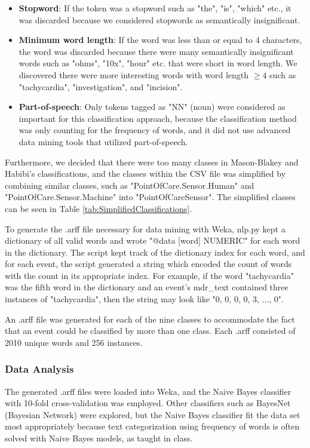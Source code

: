 \documentclass[11pt, notitlepage,abstracton,oneside]{article}   	%
\begin{document}
\begin{itemize}
	\item \textbf{Stopword}: If the token was a stopword such as "the", "is", "which" etc., it was discarded because we considered stopwords as semantically insignificant.
	\item \textbf{Minimum word length}: If the word was less than or equal to 4 characters, the word was discarded because there were many semantically insignificant words such as "ohms", "10x", "hour" etc. that were short in word length. We discovered there were more interesting words with word length $\geq 4$ such as "tachycardia", "investigation", and "incision".
	\item \textbf{Part-of-speech}: Only tokens tagged as "NN" (noun) were considered as important for this classification approach, because the classification method was only counting for the frequency of words, and it did not use advanced data mining tools that utilized part-of-speech.
\end{itemize}

Furthermore, we decided that there were too many classes in Mason-Blakey and Habibi's classifications, and the classes within the CSV file was simplified by combining similar classes, such as "PointOfCare.Sensor.Human" and "PointOfCare.Sensor.Machine" into "PointOfCareSensor". The simplified classes can be seen in Table \ref{tab:SimplifiedClassifications}.

To generate the .arff file necessary for data mining with Weka, nlp.py kept a dictionary of all valid words and wrote "@data [word] NUMERIC" for each word in the dictionary. The script kept track of the dictionary index for each word, and for each event, the script generated a string which encoded the count of words with the count in its appropriate index. For example, if the word "tachycardia" was the fifth word in the dictionary and an event's mdr\_text contained three instances of "tachycardia", then the string may look like "0, 0, 0, 0, 3, ..., 0".

An .arff file was generated for each of the nine classes to accommodate the fact that an event could be classified by more than one class. Each .arff consisted of 2010 unique words and 256 instances.

\subsubsection{Data Analysis}
The generated .arff files were loaded into Weka, and the Naive Bayes classifier with 10-fold cross-validation was employed. Other classifiers such as BayesNet (Bayesian Network) were explored, but the Naive Bayes classifier fit the data set most appropriately because text categorization using frequency of words is often solved with Naive Bayes models, as taught in class.
\end{document}

